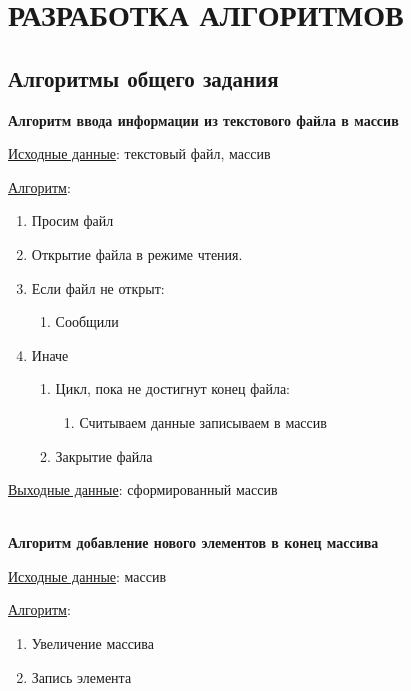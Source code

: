 \newpage

\section{РАЗРАБОТКА АЛГОРИТМОВ}

\subsection{Алгоритмы общего задания}

\textbf{Алгоритм ввода информации из текстового файла в массив}

\underline{Исходные данные}: текстовый файл, массив

\underline{Алгоритм}:

\begin{enumerate}
    \item Просим файл
    \item Открытие файла в режиме чтения.
    \item Если файл не открыт:
    \begin{enumerate}
        \item Сообщили
    \end{enumerate}
    \item Иначе
    \begin{enumerate}
        \item Цикл, пока не достигнут конец файла:
        \begin{enumerate}
            \item Считываем данные записываем в массив
        \end{enumerate}
        \item Закрытие файла
    \end{enumerate}
\end{enumerate}

\underline{Выходные данные}: сформированный массив

\hspace{0pt}\\



\textbf{Алгоритм добавление нового элементов в конец массива}

\underline{Исходные данные}: массив

\underline{Алгоритм}:

\begin{enumerate}
    \item Увеличение массива
    \item Запись элемента
\end{enumerate}

